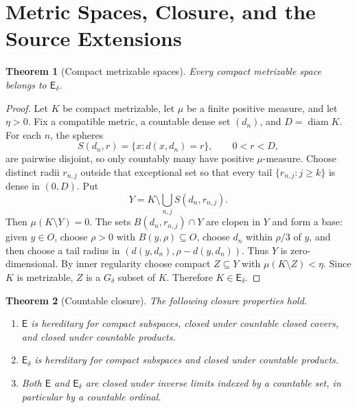 \documentclass[11pt]{article}
\newtheorem{theorem}{Theorem}
\newcommand{\E}{\mathsf E}
\newcommand{\Ed}{\mathsf E_\delta}
\begin{document}
\section{Metric Spaces, Closure, and the Source Extensions}

\begin{theorem}[Compact metrizable spaces]
Every compact metrizable space belongs to \(\Ed\).
\end{theorem}

\begin{proof}
Let \(K\) be compact metrizable, let \(\mu\) be a finite positive measure, and
let \(\eta>0\).  Fix a compatible metric, a countable dense set
\((d_n)\), and \(D=\operatorname{diam}K\).  For each \(n\), the spheres
\[
  S(d_n,r)=\{x:d(x,d_n)=r\},\qquad 0<r<D,
\]
are pairwise disjoint, so only countably many have positive \(\mu\)-measure.
Choose distinct radii \(r_{n,j}\) outside that exceptional set so that every
tail \(\{r_{n,j}:j\ge k\}\) is dense in \((0,D)\).  Put
\[
  Y=K\setminus\bigcup_{n,j} S(d_n,r_{n,j}).
\]
Then \(\mu(K\setminus Y)=0\).  The sets \(B(d_n,r_{n,j})\cap Y\) are clopen in
\(Y\) and form a base: given \(y\in O\), choose \(\rho>0\) with
\(B(y,\rho)\subseteq O\), choose \(d_n\) within \(\rho/3\) of \(y\), and then
choose a tail radius in \((d(y,d_n),\rho-d(y,d_n))\).  Thus \(Y\) is
zero-dimensional.  By inner regularity choose compact \(Z\subseteq Y\) with
\(\mu(K\setminus Z)<\eta\).  Since \(K\) is metrizable, \(Z\) is a \(G_\delta\)
subset of \(K\).  Therefore \(K\in\Ed\).
\end{proof}

\begin{theorem}[Countable closure]
The following closure properties hold.
\begin{enumerate}
\item \(\E\) is hereditary for compact subspaces, closed under countable closed
covers, and closed under countable products.
\item \(\Ed\) is hereditary for compact subspaces and closed under countable
products.
\item Both \(\E\) and \(\Ed\) are closed under inverse limits indexed by a
countable set, in particular by a countable ordinal.
\end{enumerate}
\end{theorem}
\end{document}
